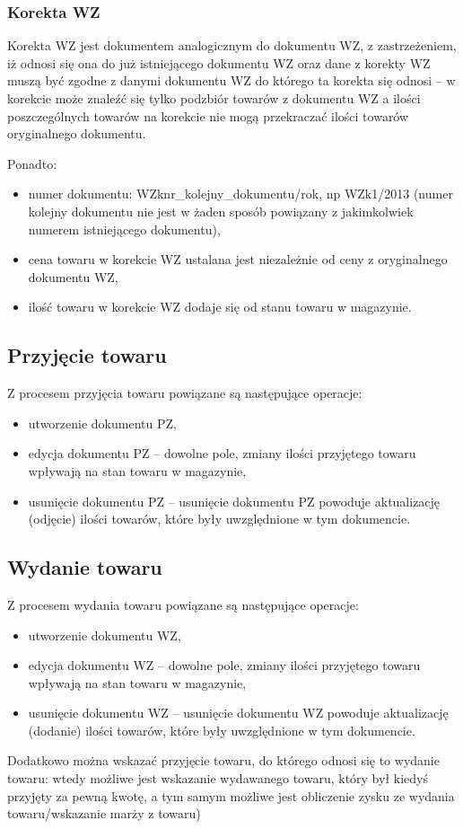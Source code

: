 \subsubsection{Korekta WZ}
Korekta WZ jest dokumentem analogicznym do dokumentu WZ, z zastrzeżeniem, iż odnosi się ona do już istniejącego dokumentu WZ oraz dane z korekty WZ muszą być zgodne z danymi dokumentu WZ do którego ta korekta się odnosi -- w korekcie może znaleźć się tylko podzbiór towarów z dokumentu WZ a ilości poszczególnych towarów na korekcie nie mogą przekraczać ilości towarów oryginalnego dokumentu.

Ponadto:
\begin{itemize}
	\item numer dokumentu: WZknr\_kolejny\_dokumentu/rok, np WZk1/2013 (numer kolejny dokumentu nie jest w żaden sposób powiązany z jakimkolwiek numerem istniejącego dokumentu),
	\item cena towaru w korekcie WZ ustalana jest niezależnie od ceny z oryginalnego dokumentu WZ,
	\item ilość towaru w korekcie WZ dodaje się od stanu towaru w magazynie.
\end{itemize}

\subsection{Przyjęcie towaru}
Z procesem przyjęcia towaru powiązane są następujące operacje:
\begin{itemize}
	\item utworzenie dokumentu PZ,
	\item edycja dokumentu PZ -- dowolne pole, zmiany ilości przyjętego towaru wpływają na stan towaru w magazynie,
	\item usunięcie dokumentu PZ -- usunięcie dokumentu PZ powoduje aktualizację (odjęcie) ilości towarów, które były uwzględnione w tym dokumencie.
\end{itemize}

\subsection{Wydanie towaru}
Z procesem wydania towaru powiązane są następujące operacje:
\begin{itemize}
	\item utworzenie dokumentu WZ,
	\item edycja dokumentu WZ -- dowolne pole, zmiany ilości przyjętego towaru wpływają na stan towaru w magazynie,
	\item usunięcie dokumentu WZ -- usunięcie dokumentu WZ powoduje aktualizację (dodanie) ilości towarów, które były uwzględnione w tym dokumencie.
\end{itemize}

Dodatkowo można wskazać przyjęcie towaru, do którego odnosi się to wydanie towaru: wtedy możliwe jest wskazanie wydawanego towaru, który był kiedyś przyjęty za pewną kwotę, a tym samym możliwe jest obliczenie zysku ze wydania towaru/wskazanie marży z towaru)